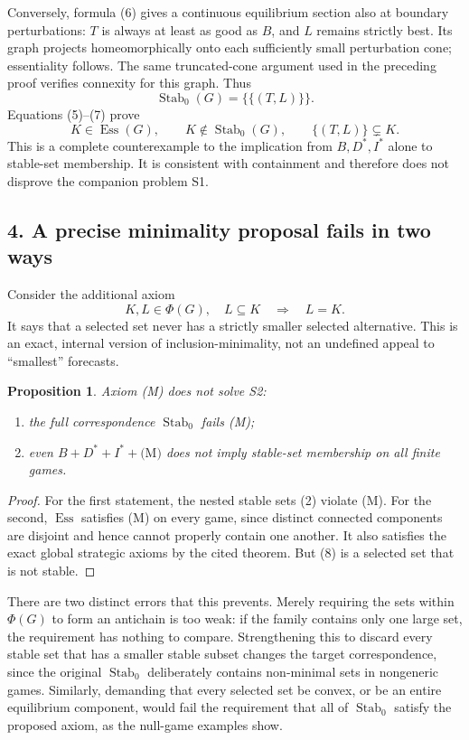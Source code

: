 \documentclass[11pt]{article}
\newcommand{\Stab}{\operatorname{Stab}_0}
\newcommand{\Ess}{\operatorname{Ess}}
\newtheorem{proposition}{Proposition}
\begin{document}
Conversely, formula (6) gives a continuous equilibrium section also at boundary perturbations: $T$ is always at least as good as $B$, and $L$ remains strictly best. Its graph projects homeomorphically onto each sufficiently small perturbation cone; essentiality follows. The same truncated-cone argument used in the preceding proof verifies connexity for this graph. Thus
\[
 \Stab(G)=\{\{(T,L)\}\}.
                                                               \tag{7}
\]
Equations (5)--(7) prove
\[
 K\in\Ess(G),\qquad K\notin\Stab(G),\qquad
 \{(T,L)\}\subsetneq K.                                      \tag{8}
\]
This is a complete counterexample to the implication from $B,D^*,I^*$ alone to stable-set membership. It is consistent with containment and therefore does not disprove the companion problem S1.

\subsection*{4. A precise minimality proposal fails in two ways}
Consider the additional axiom
\[
\tag{M}
 K,L\in\Phi(G),\quad L\subseteq K
       \quad\Longrightarrow\quad L=K.
\]
It says that a selected set never has a strictly smaller selected alternative. This is an exact, internal version of inclusion-minimality, not an undefined appeal to ``smallest'' forecasts.

\begin{proposition}
Axiom (M) does not solve S2:
\begin{enumerate}
\item the full correspondence $\Stab$ fails (M);
\item even $B+D^*+I^*+\text{(M)}$ does not imply stable-set membership on all finite games.
\end{enumerate}
\end{proposition}
\begin{proof}
For the first statement, the nested stable sets (2) violate (M). For the second, $\Ess$ satisfies (M) on every game, since distinct connected components are disjoint and hence cannot properly contain one another. It also satisfies the exact global strategic axioms by the cited theorem. But (8) is a selected set that is not stable.
\end{proof}

There are two distinct errors that this prevents. Merely requiring the sets within $\Phi(G)$ to form an antichain is too weak: if the family contains only one large set, the requirement has nothing to compare. Strengthening this to discard every stable set that has a smaller stable subset changes the target correspondence, since the original $\Stab$ deliberately contains non-minimal sets in nongeneric games. Similarly, demanding that every selected set be convex, or be an entire equilibrium component, would fail the requirement that all of $\Stab$ satisfy the proposed axiom, as the null-game examples show.
\end{document}
